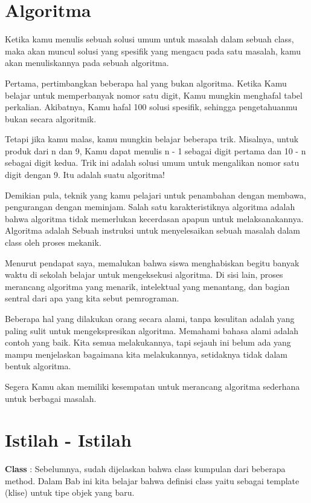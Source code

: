 \section{Algoritma}

Ketika kamu menulis sebuah solusi umum untuk masalah dalam sebuah class, maka akan muncul solusi yang spesifik yang mengacu pada satu masalah, kamu akan menuliskannya pada sebuah algoritma. 

Pertama, pertimbangkan beberapa hal yang bukan algoritma. Ketika Kamu belajar untuk memperbanyak nomor satu digit, Kamu mungkin menghafal tabel perkalian. Akibatnya, Kamu hafal 100 solusi spesifik, sehingga pengetahuanmu bukan secara algoritmik.

Tetapi jika kamu malas, kamu mungkin belajar beberapa trik. Misalnya, untuk produk dari n dan 9, Kamu dapat menulis n - 1 sebagai digit pertama dan 10 - n sebagai digit kedua. Trik ini adalah solusi umum untuk mengalikan nomor satu digit dengan 9. Itu adalah suatu algoritma!

Demikian pula, teknik yang kamu pelajari untuk penambahan dengan membawa, pengurangan dengan meminjam. Salah satu karakteristiknya algoritma adalah bahwa algoritma tidak memerlukan kecerdasan apapun untuk melaksanakannya. Algoritma adalah  Sebuah instruksi untuk menyelesaikan sebuah masalah dalam class oleh proses mekanik.

Menurut pendapat saya, memalukan bahwa siswa menghabiskan begitu banyak waktu di sekolah belajar untuk mengeksekusi algoritma. Di sisi lain, proses merancang algoritma yang menarik, intelektual yang menantang, dan bagian sentral dari apa yang kita sebut pemrograman.

Beberapa hal yang dilakukan orang secara alami, tanpa kesulitan adalah yang paling sulit untuk mengekspresikan algoritma. Memahami bahasa alami adalah contoh yang baik. Kita semua melakukannya, tapi sejauh ini belum ada yang mampu menjelaskan bagaimana kita melakukannya, setidaknya tidak dalam bentuk algoritma.

Segera Kamu akan memiliki kesempatan untuk merancang algoritma sederhana untuk berbagai masalah. 

\section{Istilah - Istilah}

\textbullet \textbf{Class} : Sebelumnya, sudah dijelaskan bahwa class kumpulan dari beberapa method. Dalam Bab ini kita belajar bahwa definisi class yaitu sebagai template (klise) untuk tipe objek yang baru. \newline

